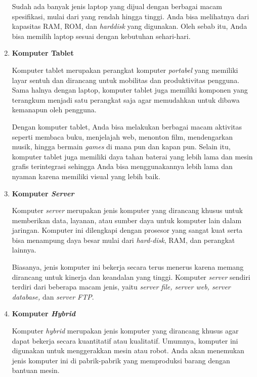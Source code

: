 \documentclass[12pt]{article}
\begin{document}
\begin{enumerate}
    \hspace{0.61cm}Sudah ada banyak jenis laptop yang dijual dengan berbagai macam spesifikasi, mulai dari yang rendah hingga tinggi. Anda bisa melihatnya dari kapasitas RAM, ROM, dan \textit{harddisk} yang digunakan. Oleh sebab itu, Anda bisa memilih laptop sesuai dengan kebutuhan sehari-hari.

    \item \textbf{Komputer Tablet} 

    \hspace{0.61cm}Komputer tablet merupakan perangkat komputer\textit{ portabel} yang memiliki layar sentuh dan dirancang untuk mobilitas dan produktivitas pengguna. Sama halnya dengan laptop, komputer tablet juga memiliki komponen yang terangkum menjadi satu perangkat saja agar memudahkan untuk dibawa kemanapun oleh pengguna. 

    \hspace{0.61cm}Dengan komputer tablet, Anda bisa melakukan berbagai macam aktivitas seperti membaca buku, menjelajah web, menonton film, mendengarkan musik, hingga bermain \textit{games} di mana pun dan kapan pun. Selain itu, komputer tablet juga memiliki daya tahan baterai yang lebih lama dan mesin grafis terintegrasi sehingga Anda bisa menggunakannya lebih lama dan nyaman karena memiliki visual yang lebih baik. 

    \item \textbf{Komputer \textit{Server}} 

    \hspace{0.61cm}Komputer \textit{server} merupakan jenis komputer yang dirancang khusus untuk memberikan data, layanan, atau sumber daya untuk komputer lain dalam jaringan. Komputer ini dilengkapi dengan prosesor yang sangat kuat serta bisa menampung daya besar mulai dari \textit{hard-disk}, RAM, dan perangkat lainnya. 

    \hspace{0.61cm}Biasanya, jenis komputer ini bekerja secara terus menerus karena memang dirancang untuk kinerja dan keandalan yang tinggi. Komputer \textit{server} sendiri terdiri dari beberapa macam jenis, yaitu \textit{server file, server web, server database,} dan \textit{server FTP}. 

    \item \textbf{Komputer \textit{Hybrid} }
    
    \hspace{0.61cm}Komputer \textit{hybrid} merupakan jenis komputer yang dirancang khusus agar dapat bekerja secara kuantitatif atau kualitatif. Umumnya, komputer ini digunakan untuk menggerakkan mesin atau robot. Anda akan menemukan jenis komputer ini di pabrik-pabrik yang memproduksi barang dengan bantuan mesin.


\end{enumerate}
\end{document}
